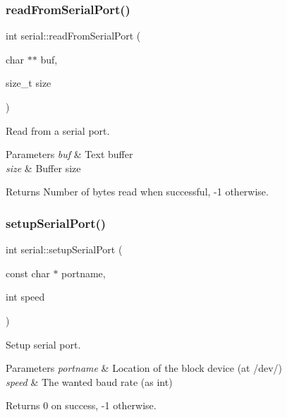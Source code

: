 \subsubsection{\texorpdfstring{read\+From\+Serial\+Port()}{readFromSerialPort()}}
{\footnotesize\ttfamily int serial\+::read\+From\+Serial\+Port (\begin{DoxyParamCaption}\item[{char $\ast$$\ast$}]{buf,  }\item[{size\+\_\+t}]{size }\end{DoxyParamCaption})}



Read from a serial port. 


\begin{DoxyParams}{Parameters}
{\em buf} & Text buffer \\
\hline
{\em size} & Buffer size\\
\hline
\end{DoxyParams}
\begin{DoxyReturn}{Returns}
Number of bytes read when successful, -\/1 otherwise. 
\end{DoxyReturn}
\mbox{\label{classserial_a0490dba2c7616a997ca6db6903f6865a}} 
\subsubsection{\texorpdfstring{setup\+Serial\+Port()}{setupSerialPort()}}
{\footnotesize\ttfamily int serial\+::setup\+Serial\+Port (\begin{DoxyParamCaption}\item[{const char $\ast$}]{portname,  }\item[{int}]{speed }\end{DoxyParamCaption})}



Setup serial port. 


\begin{DoxyParams}{Parameters}
{\em portname} & Location of the block device (at /dev/) \\
\hline
{\em speed} & The wanted baud rate (as int)\\
\hline
\end{DoxyParams}
\begin{DoxyReturn}{Returns}
0 on success, -\/1 otherwise. 
\end{DoxyReturn}
\mbox{\label{classserial_af9701c5cbb3402a67291c07d57b3d535}} 
